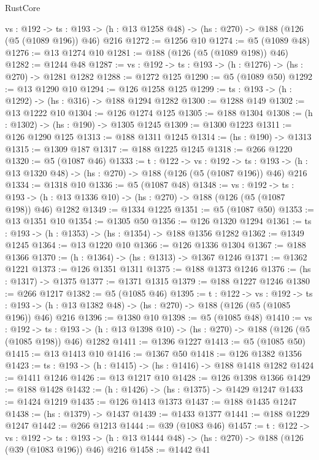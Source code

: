 \begin{lexlean}{RustCore}
\begin{coremodule}
  {vs : @192} ->
  {ts : @193} -> (h : @13 @1258 @48) -> (hs : @270) -> @188 (@126 (@5 (@1089 @196)) @46) @216
@1272 := @1256 @10
@1274 := @5 (@1089 @48)
@1276 := @13 @1274 @10
@1281 := @188 (@126 (@5 (@1089 @198)) @46)
@1282 := @1244 @48
@1287 := {vs : @192} -> {ts : @193} -> (h : @1276) -> (hs : @270) -> @1281 @1282
@1288 := @1272 @125
@1290 := @5 (@1089 @50)
@1292 := @13 @1290 @10
@1294 := @126 @1258 @125
@1299 := {ts : @193} -> (h : @1292) -> (hs : @316) -> @188 @1294 @1282
@1300 := @1288 @149
@1302 := @13 @1222 @10
@1304 := @126 @1274 @125
@1305 := @188 @1304
@1308 := (h : @1302) -> (hs : @190) -> @1305 @1245
@1309 := @1300 @1223
@1311 := @126 @1290 @125
@1313 := @188 @1311 @1245
@1314 := (hs : @190) -> @1313
@1315 := @1309 @187
@1317 := @188 @1225 @1245
@1318 := @266 @1220
@1320 := @5 (@1087 @46)
@1333 := {t : @122} ->
  {vs : @192} ->
  {ts : @193} -> (h : @13 @1320 @48) -> (hs : @270) -> @188 (@126 (@5 (@1087 @196)) @46) @216
@1334 := @1318 @10
@1336 := @5 (@1087 @48)
@1348 := {vs : @192} ->
  {ts : @193} -> (h : @13 @1336 @10) -> (hs : @270) -> @188 (@126 (@5 (@1087 @198)) @46) @1282
@1349 := @1334 @1225
@1351 := @5 (@1087 @50)
@1353 := @13 @1351 @10
@1354 := @1305 @50
@1356 := @126 @1320 @1294
@1361 := {ts : @193} -> (h : @1353) -> (hs : @1354) -> @188 @1356 @1282
@1362 := @1349 @1245
@1364 := @13 @1220 @10
@1366 := @126 @1336 @1304
@1367 := @188 @1366
@1370 := (h : @1364) -> (hs : @1313) -> @1367 @1246
@1371 := @1362 @1221
@1373 := @126 @1351 @1311
@1375 := @188 @1373 @1246
@1376 := (hs : @1317) -> @1375
@1377 := @1371 @1315
@1379 := @188 @1227 @1246
@1380 := @266 @1217
@1382 := @5 (@1085 @46)
@1395 := {t : @122} ->
  {vs : @192} ->
  {ts : @193} -> (h : @13 @1382 @48) -> (hs : @270) -> @188 (@126 (@5 (@1085 @196)) @46) @216
@1396 := @1380 @10
@1398 := @5 (@1085 @48)
@1410 := {vs : @192} ->
  {ts : @193} -> (h : @13 @1398 @10) -> (hs : @270) -> @188 (@126 (@5 (@1085 @198)) @46) @1282
@1411 := @1396 @1227
@1413 := @5 (@1085 @50)
@1415 := @13 @1413 @10
@1416 := @1367 @50
@1418 := @126 @1382 @1356
@1423 := {ts : @193} -> (h : @1415) -> (hs : @1416) -> @188 @1418 @1282
@1424 := @1411 @1246
@1426 := @13 @1217 @10
@1428 := @126 @1398 @1366
@1429 := @188 @1428
@1432 := (h : @1426) -> (hs : @1375) -> @1429 @1247
@1433 := @1424 @1219
@1435 := @126 @1413 @1373
@1437 := @188 @1435 @1247
@1438 := (hs : @1379) -> @1437
@1439 := @1433 @1377
@1441 := @188 @1229 @1247
@1442 := @266 @1213
@1444 := @39 (@1083 @46)
@1457 := {t : @122} ->
  {vs : @192} ->
  {ts : @193} -> (h : @13 @1444 @48) -> (hs : @270) -> @188 (@126 (@39 (@1083 @196)) @46) @216
@1458 := @1442 @41

\end{coremodule}
\end{lexlean}
